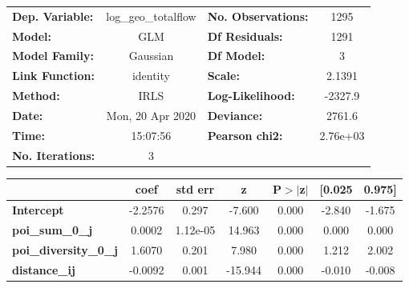 \begin{center}
\begin{tabular}{lclc}
\toprule
\textbf{Dep. Variable:}       & log\_geo\_totalflow & \textbf{  No. Observations:  } &     1295    \\
\textbf{Model:}               &         GLM         & \textbf{  Df Residuals:      } &     1291    \\
\textbf{Model Family:}        &       Gaussian      & \textbf{  Df Model:          } &        3    \\
\textbf{Link Function:}       &       identity      & \textbf{  Scale:             } &    2.1391   \\
\textbf{Method:}              &         IRLS        & \textbf{  Log-Likelihood:    } &   -2327.9   \\
\textbf{Date:}                &   Mon, 20 Apr 2020  & \textbf{  Deviance:          } &    2761.6   \\
\textbf{Time:}                &       15:07:56      & \textbf{  Pearson chi2:      } &  2.76e+03   \\
\textbf{No. Iterations:}      &          3          & \textbf{                     } &             \\
\bottomrule
\end{tabular}
\begin{tabular}{lcccccc}
                              & \textbf{coef} & \textbf{std err} & \textbf{z} & \textbf{P$> |$z$|$} & \textbf{[0.025} & \textbf{0.975]}  \\
\midrule
\textbf{Intercept}            &      -2.2576  &        0.297     &    -7.600  &         0.000        &       -2.840    &       -1.675     \\
\textbf{poi\_sum\_0\_j}       &       0.0002  &     1.12e-05     &    14.963  &         0.000        &        0.000    &        0.000     \\
\textbf{poi\_diversity\_0\_j} &       1.6070  &        0.201     &     7.980  &         0.000        &        1.212    &        2.002     \\
\textbf{distance\_ij}         &      -0.0092  &        0.001     &   -15.944  &         0.000        &       -0.010    &       -0.008     \\
\bottomrule
\end{tabular}
\end{center}